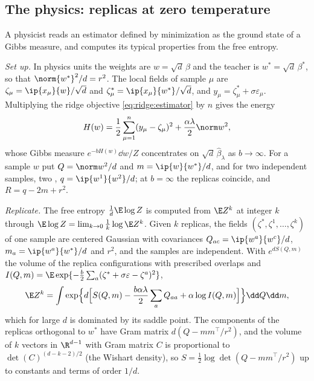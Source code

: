 \begin{refsection}
\section{The physics: replicas at zero temperature}\label{sec:ridge:physics}

A physicist reads an estimator defined by minimization as the ground state of a Gibbs measure, and computes its typical properties from the free entropy.

\begin{heuristic}
\emph{Set up.} In physics units the weights are $w=\sqrt d\,\beta$ and the teacher is $w^*=\sqrt d\,\beta^*$, so that $\norm{w^*}^2/d=r^2$. The local fields of sample $\mu$ are $\zeta_\mu=\ip{x_\mu}{w}/\sqrt d$ and $\zeta^*_\mu=\ip{x_\mu}{w^*}/\sqrt d$, and $y_\mu=\zeta^*_\mu+\sigma\varepsilon_\mu$. Multiplying the ridge objective \eqref{eq:ridge:estimator} by $n$ gives the energy
\begin{equation}\label{eq:ridge:energy}
H(w)=\frac12\sum_{\mu=1}^n(y_\mu-\zeta_\mu)^2+\frac{\alpha\lambda}2\norm w^2,
\end{equation}
whose Gibbs measure $e^{-bH(w)}\dd w/Z$ concentrates on $\sqrt d\,\hat\beta_\lambda$ as $b\to\infty$. For a sample $w$ put $Q=\norm w^2/d$ and $m=\ip{w}{w^*}/d$, and for two independent samples, two , $q=\ip{w^1}{w^2}/d$; at $b=\infty$ the replicas coincide, and $R=q-2m+r^2$.

\emph{Replicate.} The free entropy $\frac1d\E\log Z$ is computed from $\E Z^k$ at integer $k$ through $\E\log Z=\lim_{k\to0}\frac1k\log\E Z^k$. Given $k$ replicas, the fields $(\zeta^*,\zeta^1,\dots,\zeta^k)$ of one sample are centered Gaussian with covariances $Q_{ac}=\ip{w^a}{w^c}/d$, $m_a=\ip{w^a}{w^*}/d$ and $r^2$, and the samples are independent. With $e^{dS(Q,m)}$ the volume of the replica configurations with prescribed overlaps and $I(Q,m)=\E\exp\{-\frac b2\sum_a(\zeta^*+\sigma\varepsilon-\zeta^a)^2\}$,
\[
\E Z^k=\int\exp\Bigl\{d\Bigl[S(Q,m)-\frac{b\alpha\lambda}2\sum_aQ_{aa}+\alpha\log I(Q,m)\Bigr]\Bigr\}\dd Q\dd m ,
\]
which for large $d$ is dominated by its saddle point. The components of the replicas orthogonal to $w^*$ have Gram matrix $d(Q-mm^\top/r^2)$, and the volume of $k$ vectors in $\R^{d-1}$ with Gram matrix $C$ is proportional to $\det(C)^{(d-k-2)/2}$ (the Wishart density), so $S=\frac12\log\det(Q-mm^\top/r^2)$ up to constants and terms of order $1/d$.


\end{heuristic}
\end{refsection}
